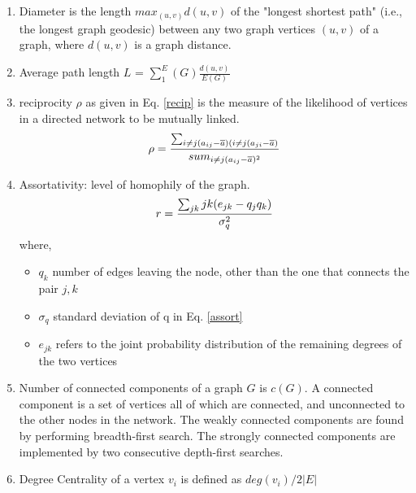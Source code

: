 \documentclass[preprint,12pt]{elsarticle}
\begin{document}
\begin{enumerate}
\item Diameter is the length $max_{(u,v)}d(u,v)$ of the "longest shortest path" (i.e., the longest graph geodesic) between any two graph vertices $(u,v)$ of a graph, where $d(u,v)$ is a graph distance.\\

\item Average path length $L$ = $\sum_1^E(G) \frac{d(u,v)}{E(G)}$\\

\item reciprocity $\rho$ as given in Eq. \ref{recip} is the measure of the likelihood of vertices in a directed network to be mutually linked.\\

\begin{equation}\label{recip}
    \rho = \frac{\sum_{i \neq j (a_{ij} - \overline{a})(i \neq j (a_{ji} - \overline{a})}}{sum_{i \neq j (a_{ij} - \overline{a})^2}}\\
\end{equation}

\item Assortativity: level of homophily of the graph.\\
\begin{equation}\label{assort}
    r = \frac{\sum_{jk} jk(e_{jk} - q_jq_k)}{\sigma^2_q}\\
\end{equation}
where,
\begin{itemize}
    \item $q_k$ number of edges leaving the node, other than the one that connects the pair $j, k$
    \item $\sigma_q$ standard deviation of q in Eq. \ref{assort}
    \item $e_{jk}$ refers to the joint probability distribution of the remaining degrees of the two vertices\\
\end{itemize}

\item Number of connected components of a graph $G$ is $c(G)$. A connected component is a set of vertices all of which are connected, and unconnected to the other nodes in the network. The weakly connected components are found by performing breadth-first search. The strongly connected components are implemented by two consecutive depth-first searches.

\item Degree Centrality of a vertex  $v_i$ is defined as $deg(v_i)/2|E|$


\end{enumerate}
\end{document}
